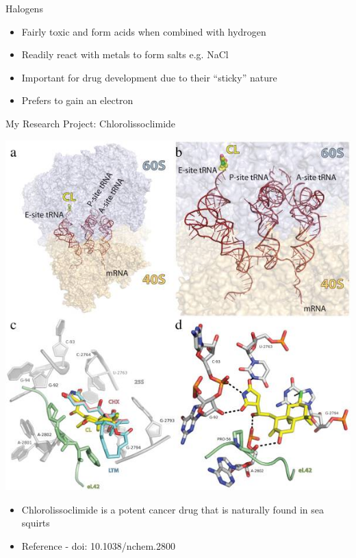 \documentclass[11pt]{beamer}
\begin{document}
\begin{frame}{Halogens}
  \begin{itemize}
  \item Fairly toxic and form acids when combined with
    hydrogen
  \item Readily react with metals to form salts e.g.
    NaCl
  \item Important for drug development due to their ``sticky''
    nature
  \item Prefers to gain an electron
  \end{itemize}
\end{frame}

\begin{frame}{My Research Project: Chlorolissoclimide}
  \begin{center}
    \includegraphics[trim={0 4.2in 0 0},clip,scale=0.45]{lisso_drug}
  \end{center}

  \begin{itemize}
  \item Chlorolissoclimide is a potent cancer drug that
    is naturally found in sea squirts
  \item Reference - doi: 10.1038/nchem.2800
  \end{itemize}
\end{frame}
\end{document}
